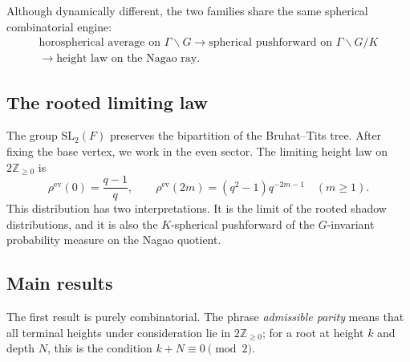 \documentclass[11pt]{amsart}
\theoremstyle{definition}
\theoremstyle{plain}
\newcommand{\ZZ}{\mathbb Z}
\newcommand{\ev}{\mathrm{ev}}
\begin{document}
Although dynamically different, the two families share the same spherical
combinatorial engine:
\[
\begin{gathered}
\text{horospherical average on }\Gamma\backslash G
\longrightarrow
\text{spherical pushforward on }\Gamma\backslash G/K\\
\longrightarrow
\text{height law on the Nagao ray}.
\end{gathered}
\]

\subsection{The rooted limiting law}
The group \(\mathrm{SL}_2(F)\) preserves the bipartition of the Bruhat--Tits tree.
After fixing the base vertex, we work in the even sector.  The limiting height
law on \(2\ZZ_{\ge0}\) is
\begin{equation}\label{eq:rhoev}
\rho^{\ev}(0)=\frac{q-1}{q},\qquad
\rho^{\ev}(2m)=(q^2-1)q^{-2m-1}\quad (m\ge 1).
\end{equation}
This distribution has two interpretations.  It is the limit of the rooted shadow
distributions, and it is also the \(K\)-spherical pushforward of the
\(G\)-invariant probability measure on the Nagao quotient.

\subsection{Main results}
The first result is purely combinatorial.  The phrase \emph{admissible parity}
means that all terminal heights under consideration lie in \(2\ZZ_{\ge0}\); for a
root at height \(k\) and depth \(N\), this is the condition \(k+N\equiv 0\pmod2\).
\end{document}
